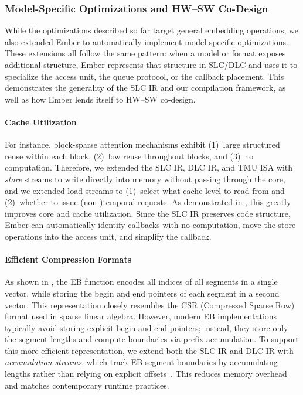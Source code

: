 \subsubsection{Model-Specific Optimizations and HW--SW Co-Design} \label{sec:ember-model-specific-optimizations} %

While the optimizations described so far target general embedding operations, we also extended Ember to automatically implement model-specific optimizations. These extensions all follow the same pattern: when a model or format exposes additional structure, Ember represents that structure in SLC/DLC and uses it to specialize the access unit, the queue protocol, or the callback placement. This demonstrates the generality of the SLC IR and our compilation framework, as well as how Ember lends itself to HW--SW co-design.

\paragraph{Cache Utilization} \label{sec:cache-utilization-optimization} %

For instance, block-sparse attention mechanisms exhibit (1)~large structured reuse within each block, (2)~low reuse throughout blocks, and (3)~no computation. Therefore, we extended the SLC IR, DLC IR, and TMU ISA with \emph{store} streams to write directly into memory without passing through the core, and we extended load streams to (1)~select what cache level to read from and (2)~whether to issue (non-)temporal requests. As demonstrated in , this greatly improves core and cache utilization. Since the SLC IR preserves code structure, Ember can automatically identify callbacks with no computation, move the store operations into the access unit, and simplify the callback.

\paragraph{Efficient Compression Formats} \label{sec:efficient-compression-formats} %

As shown in , the EB function encodes all indices of all segments in a single vector, while storing the begin and end pointers of each segment in a second vector. This representation closely resembles the CSR (Compressed Sparse Row) format used in sparse linear algebra. However, modern EB implementations~\cite{paszke2019neurips} typically avoid storing explicit begin and end pointers; instead, they store only the segment lengths and compute boundaries via prefix accumulation. To support this more efficient representation, we extend both the SLC IR and DLC IR with \emph{accumulation streams}, which track EB segment boundaries by accumulating lengths rather than relying on explicit offsets~\cite{mudigere2022isca}. This reduces memory overhead and matches contemporary runtime practices.

